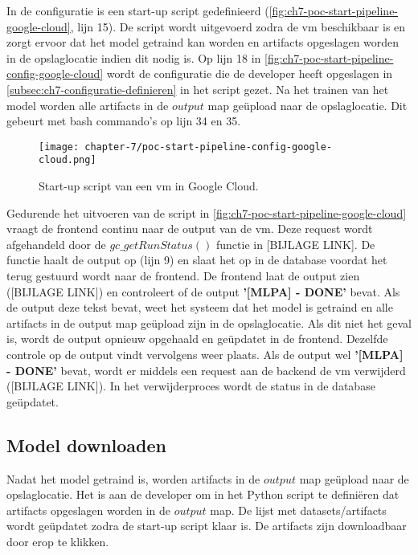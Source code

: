 \newpage

In de configuratie is een start-up script gedefinieerd (\autoref{fig:ch7-poc-start-pipeline-google-cloud}, lijn 15). De script wordt uitgevoerd zodra de \acrshort{vm} beschikbaar is en zorgt ervoor dat het model getraind kan worden en \glspl{artifact} opgeslagen worden in de opslaglocatie indien dit nodig is. Op lijn 18 in \autoref{fig:ch7-poc-start-pipeline-config-google-cloud} wordt de configuratie die de developer heeft opgeslagen in \autoref{subsec:ch7-configuratie-definieren} in het script gezet. Na het trainen van het model worden alle \glspl{artifact} in de \(output\) map geüpload naar de opslaglocatie. Dit gebeurt met bash commando's op lijn 34 en 35.

\newpage

\begin{figure}[hbt!]
  \centering
  \texttt{[image: chapter-7/poc-start-pipeline-config-google-cloud.png]}
  \caption{Start-up script van een \acrfull{vm} in Google Cloud.}
  \label{fig:ch7-poc-start-pipeline-config-google-cloud}
\end{figure}

Gedurende het uitvoeren van de script in \autoref{fig:ch7-poc-start-pipeline-google-cloud} vraagt de frontend continu naar de output van de \acrshort{vm}. Deze request wordt afgehandeld door de \(gc\_getRunStatus()\) functie in [BIJLAGE LINK]. De functie haalt de output op (lijn 9) en slaat het op in de database voordat het terug gestuurd wordt naar de frontend. De frontend laat de output zien ([BIJLAGE LINK]) en controleert of de output \textbf{'[MLPA] - DONE'} bevat. Als de output deze tekst bevat, weet het systeem dat het model is getraind en alle \glspl{artifact} in de output map geüpload zijn in de opslaglocatie. Als dit niet het geval is, wordt de output opnieuw opgehaald en geüpdatet in de frontend. Dezelfde controle op de output vindt vervolgens weer plaats. Als de output wel \textbf{'[MLPA] - DONE'} bevat, wordt er middels een request aan de backend de \acrshort{vm} verwijderd ([BIJLAGE LINK]). In het verwijderproces wordt de status in de database geüpdatet.

\subsection{Model downloaden}\label{subsec:ch7-model-downloaden}
Nadat het model getraind is, worden \glspl{artifact} in de \(output\) map geüpload naar de opslaglocatie. Het is aan de developer om in het Python script te definiëren dat artifacts opgeslagen worden in de \(output\) map. De lijst met datasets/\glspl{artifact} wordt geüpdatet zodra de start-up script klaar is. De \glspl{artifact} zijn downloadbaar door erop te klikken.

